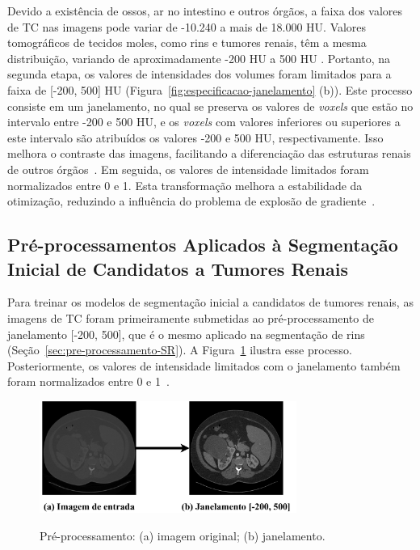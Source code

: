 Devido a existência de ossos, ar no intestino e outros órgãos, a faixa dos valores de TC nas imagens pode variar de -10.240 a mais de 18.000 HU. Valores tomográficos de tecidos moles, como rins e tumores renais, têm a mesma distribuição, variando de aproximadamente -200 HU a 500 HU \cite{Buzug2011, ADAMS2012277, yang2018automatic}. Portanto, na segunda etapa, os valores de intensidades dos volumes foram limitados para a faixa de [-200, 500] HU (Figura~\ref{fig:especificacao-janelamento} (b)). Este processo consiste em um janelamento, no qual se preserva os valores de \textit{voxels} que estão no intervalo entre -200 e 500 HU, e os \textit{voxels} com valores inferiores ou superiores a este intervalo são atribuídos os valores -200 e 500 HU, respectivamente. Isso melhora o contraste das imagens, facilitando a diferenciação das estruturas renais de outros órgãos~\cite{yang2018automatic,da2020kidney}. Em seguida, os valores de intensidade limitados foram normalizados entre 0 e 1. Esta transformação melhora a estabilidade da otimização, reduzindo a influência do problema de explosão de gradiente~\cite{Jason2019, Yash2021}.

\subsection{Pré-processamentos Aplicados à Segmentação Inicial de Candidatos a Tumores Renais}
\label{sec:pre-processamento-SRTR}

Para treinar os modelos de segmentação inicial a candidatos de tumores renais, as imagens de TC foram primeiramente submetidas ao pré-processamento de janelamento [-200, 500], que é o mesmo aplicado na segmentação de rins (Seção~\ref{sec:pre-processamento-SR}). A Figura~\ref{fig:janelamento} ilustra esse processo. Posteriormente, os valores de intensidade limitados com o janelamento também foram normalizados entre 0 e 1~\cite{Hands2017}.

\begin{figure}[!ht]
    \centering
    \caption{Pré-processamento: (a) imagem original; (b) janelamento.}
    \includegraphics[width=0.75\textwidth]{figuras/janelamento.pdf}
    \label{fig:janelamento}
\end{figure}

